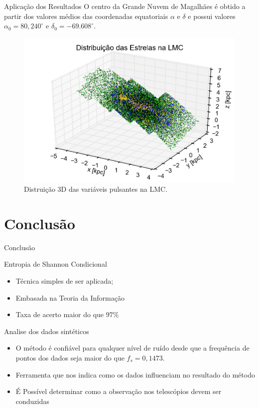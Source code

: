 \documentclass{beamer}
\begin{document}
\begin{frame}[allowframebreaks]{Aplicação dos Resultados}
O centro da Grande Nuvem de Magalhães é obtido a partir dos valores médios das coordenadas equatoriais $\alpha$ e $\delta$ e possui valores $\alpha_0 = 80,240^\circ$ e $\delta_0 = -69.608^\circ$.

\framebreak

\begin{figure}
\centering
\includegraphics[width=0.8\linewidth]{plot3d.png}
\caption{Distruição 3D das variáveis pulsantes na LMC.}
\end{figure}
\end{frame}

\section{Conclusão}

\begin{frame}{Conclusão}

\begin{block}{Entropia de Shannon Condicional}

\begin{itemize}
  \item Técnica simples de ser aplicada;
  \item Embasada na Teoria da Informação
  \item Taxa de acerto maior do que $97\%$
\end{itemize}
\end{block}


\begin{block}{Analise dos dados sintéticos}
\begin{itemize}
  \item O método é confiável para qualquer nível de ruído desde que a frequência de pontos dos dados seja maior do que $f_s = 0,1473$.
  \item Ferramenta que nos indica como os dados influenciam no resultado do método
  \item É Possível determinar como a observação nos telescópios devem ser conduzidas
\end{itemize}
\end{block}

\end{frame}
\end{document}
